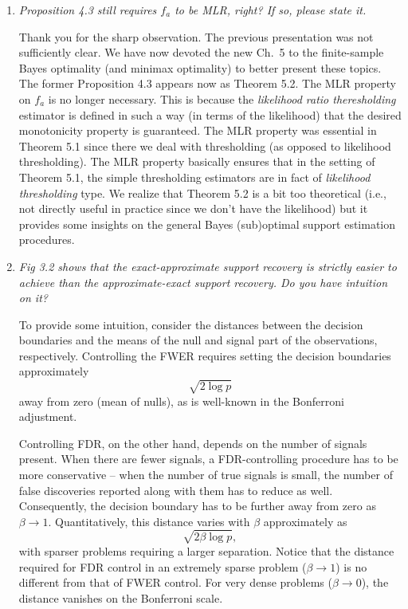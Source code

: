 \documentclass[11pt]{article}
\begin{document}
\begin{enumerate}
    \item {\em Proposition 4.3 still requires $f_a$ to be MLR, right? If so, please state it.}
    
    Thank you for the sharp observation.  The previous presentation was not sufficiently clear.  We have now devoted the new Ch.\ 5 to the
    finite-sample Bayes optimality (and minimax optimality) to better present these topics.  
    The former Proposition 4.3 appears now as Theorem 5.2.  The MLR property on $f_a$
    is no longer necessary.  This is because the {\em likelihood ratio theresholding} estimator is defined in such a way (in terms of the likelihood) that
    the desired monotonicity property is guaranteed.  The MLR property was essential in Theorem 5.1 since there we deal with thresholding (as opposed to
    likelihood thresholding). The MLR property basically ensures that in the setting of Theorem 5.1, the simple thresholding estimators are in fact of
    {\em likelihood thresholding} type.  We realize that Theorem 5.2 is a bit too theoretical (i.e., not directly useful in practice since we don't have the 
    likelihood) but it provides some insights on
    the general Bayes (sub)optimal support estimation procedures.
   
    \item  {\em Fig 3.2 shows that the exact-approximate support recovery is strictly easier to achieve than the approximate-exact support recovery. Do you have intuition on it?}

    To provide some intuition, consider the distances between the decision boundaries and the means of the null and signal part of the observations, respectively.
    Controlling the FWER requires setting the decision boundaries approximately 
    \begin{equation} \label{FWER}
    \sqrt{2\log{p}}
    \end{equation}
    away from zero (mean of nulls), as is well-known in the Bonferroni adjustment.
    
    Controlling FDR, on the other hand, depends on the number of signals present.
    When there are fewer signals, a FDR-controlling procedure has to be more conservative -- when the number of true signals is small, the number of false discoveries reported along with them has to reduce as well.
    Consequently, the decision boundary has to be further away from zero as $\beta\to1$.
    Quantitatively, this distance varies with $\beta$ approximately as
    \begin{equation} \label{FDR}
    \sqrt{2\beta\log{p}},
    \end{equation}
    with sparser problems requiring a larger separation. 
    Notice that the distance required for FDR control in an extremely sparse problem ($\beta\to1$) is no different from that of FWER control.
    For very dense problems ($\beta\to0$), the distance vanishes on the Bonferroni scale.
    

\end{enumerate}
\end{document}

